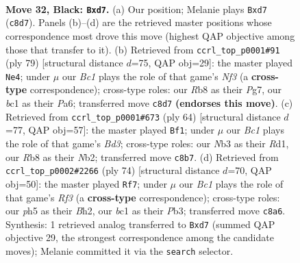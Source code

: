 \documentclass[11pt]{article}
\begin{document}
\clearpage

\begin{figure}[p]\centering
\begin{subfigure}{0.46\textwidth}\centering
\resizebox{\linewidth}{!}{%
\newchessgame
\chessboard[
  setfen={1rb3k1/p1pP1pp1/7p/4r2P/p5n1/1nPK4/6R1/R1B2BN1 b - - 0 32},
  showmover=false,
  pgfstyle=straightmove, color=movearrow, markmove={c8-d7}
]}
\caption{}
\end{subfigure}\hfill
\begin{subfigure}{0.46\textwidth}\centering
\resizebox{\linewidth}{!}{%
\newchessgame
\chessboard[
  setfen={k3r3/1p3np1/p4n2/2r1p1P1/2P5/6R1/1B2BP2/1K1R4 b - - 0 40},
  showmover=false,
  pgfstyle=straightmove, color=movearrow, markmove={f6-e4}
]}
\caption{}
\end{subfigure}
\\[4pt]
\begin{subfigure}{0.46\textwidth}\centering
\resizebox{\linewidth}{!}{%
\newchessgame
\chessboard[
  setfen={1r6/5k2/RP2bn1p/6p1/4p3/2rBP2P/PN1b1PP1/3R2K1 w - - 0 33},
  showmover=false,
  pgfstyle=straightmove, color=movearrow, markmove={d3-f1}
]}
\caption{}
\end{subfigure}\hfill
\begin{subfigure}{0.46\textwidth}\centering
\resizebox{\linewidth}{!}{%
\newchessgame
\chessboard[
  setfen={6k1/7n/p1p3pp/P3p1b1/2N5/1Prr1R1P/6PB/5R1K w - - 0 38},
  showmover=false,
  pgfstyle=straightmove, color=movearrow, markmove={f3-f7}
]}
\caption{}
\end{subfigure}
\caption{\textbf{Move 32, Black: \texttt{Bxd7}.} (a) Our position; Melanie plays \texttt{Bxd7} (\texttt{c8d7}). Panels (b)--(d) are the retrieved master positions whose correspondence most drove this move (highest QAP objective among those that transfer to it). (b) Retrieved from \texttt{ccrl\_top\_p0001\#91} (ply 79) [structural distance $d$=75, QAP obj=29]: the master played \texttt{Ne4}; under $\mu$ our \emph{Bc1} plays the role of that game's \emph{Nf3} (a \textbf{cross-type} correspondence); cross-type roles: our \emph{R}b8 as their \emph{P}g7, our \emph{b}c1 as their \emph{P}a6; transferred move \texttt{c8d7} \textbf{(endorses this move)}. (c) Retrieved from \texttt{ccrl\_top\_p0001\#673} (ply 64) [structural distance $d$=77, QAP obj=57]: the master played \texttt{Bf1}; under $\mu$ our \emph{Bc1} plays the role of that game's \emph{Bd3}; cross-type roles: our \emph{N}b3 as their \emph{R}d1, our \emph{R}b8 as their \emph{N}b2; transferred move \texttt{c8b7}. (d) Retrieved from \texttt{ccrl\_top\_p0002\#2266} (ply 74) [structural distance $d$=70, QAP obj=50]: the master played \texttt{Rf7}; under $\mu$ our \emph{Bc1} plays the role of that game's \emph{Rf3} (a \textbf{cross-type} correspondence); cross-type roles: our \emph{p}h5 as their \emph{B}h2, our \emph{b}c1 as their \emph{P}b3; transferred move \texttt{c8a6}. Synthesis: 1 retrieved analog transferred to \texttt{Bxd7} (summed QAP objective 29, the strongest correspondence among the candidate moves); Melanie committed it via the \texttt{search} selector.}
\label{fig:thought-m63}
\end{figure}
\end{document}
